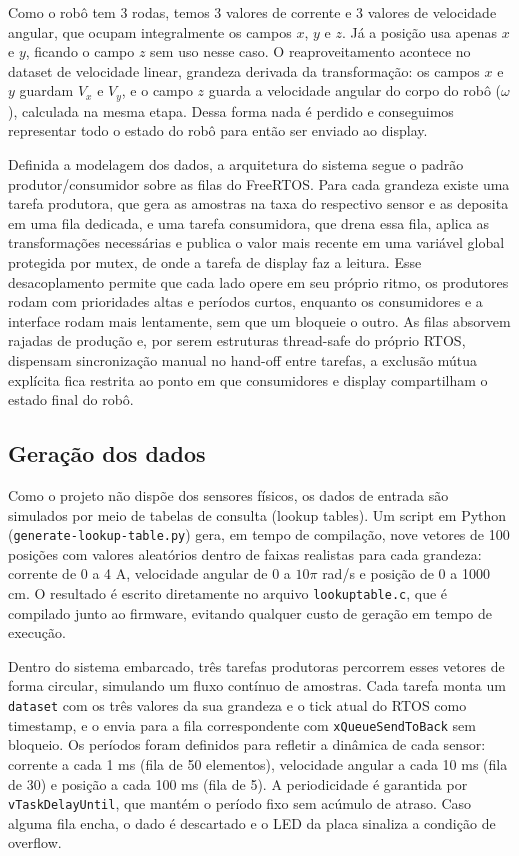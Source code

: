 \documentclass[a4paper,10pt]{article}
\begin{document}
Como o robô tem 3 rodas, temos 3 valores de corrente e 3 valores de velocidade angular, que ocupam integralmente os campos $x$, $y$ e $z$. Já a posição usa apenas $x$ e $y$, ficando o campo $z$ sem uso nesse caso. O reaproveitamento acontece no dataset de velocidade linear, grandeza derivada da transformação: os campos $x$ e $y$ guardam $V_x$ e $V_y$, e o campo $z$ guarda a velocidade angular do corpo do robô ($\omega$), calculada na mesma etapa. Dessa forma nada é perdido e conseguimos representar todo o estado do robô para então ser enviado ao display.

Definida a modelagem dos dados, a arquitetura do sistema segue o padrão produtor/consumidor sobre as filas do FreeRTOS. Para cada grandeza existe uma tarefa produtora, que gera as amostras na taxa do respectivo sensor e as deposita em uma fila dedicada, e uma tarefa consumidora, que drena essa fila, aplica as transformações necessárias e publica o valor mais recente em uma variável global protegida por mutex, de onde a tarefa de display faz a leitura. Esse desacoplamento permite que cada lado opere em seu próprio ritmo, os produtores rodam com prioridades altas e períodos curtos, enquanto os consumidores e a interface rodam mais lentamente, sem que um bloqueie o outro. As filas absorvem rajadas de produção e, por serem estruturas thread-safe do próprio RTOS, dispensam sincronização manual no hand-off entre tarefas, a exclusão mútua explícita fica restrita ao ponto em que consumidores e display compartilham o estado final do robô.

\subsection{Geração dos dados}

Como o projeto não dispõe dos sensores físicos, os dados de entrada são simulados por meio de tabelas de consulta (lookup tables). Um script em Python (\texttt{generate-lookup-table.py}) gera, em tempo de compilação, nove vetores de 100 posições com valores aleatórios dentro de faixas realistas para cada grandeza: corrente de 0 a 4 A, velocidade angular de 0 a $10\pi$ rad/s e posição de 0 a 1000 cm. O resultado é escrito diretamente no arquivo \texttt{lookuptable.c}, que é compilado junto ao firmware, evitando qualquer custo de geração em tempo de execução.

Dentro do sistema embarcado, três tarefas produtoras percorrem esses vetores de forma circular, simulando um fluxo contínuo de amostras. Cada tarefa monta um \texttt{dataset} com os três valores da sua grandeza e o tick atual do RTOS como timestamp, e o envia para a fila correspondente com \texttt{xQueueSendToBack} sem bloqueio. Os períodos foram definidos para refletir a dinâmica de cada sensor: corrente a cada 1 ms (fila de 50 elementos), velocidade angular a cada 10 ms (fila de 30) e posição a cada 100 ms (fila de 5). A periodicidade é garantida por \texttt{vTaskDelayUntil}, que mantém o período fixo sem acúmulo de atraso. Caso alguma fila encha, o dado é descartado e o LED da placa sinaliza a condição de overflow.
\end{document}

